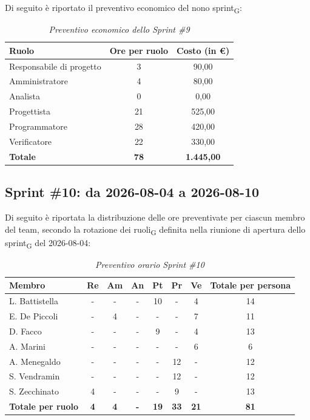 ﻿\documentclass[a4paper, 10pt, colorlinks=true, linkcolor=black, urlcolor=blue, citecolor=blue, hidelinks]{article}
\renewcommand{\arraystretch}{1.2}
\begin{document}
Di seguito è riportato il preventivo economico del nono sprint\textsubscript{G}:

\begin{table}[H]
    \centering
    \renewcommand{\arraystretch}{1.4}
    \begin{tabular}{|l|c|c|}
        \hline
        \rowcolor{bluBitless!15}
        \textbf{Ruolo} & \textbf{Ore per ruolo} & \textbf{Costo (in €)} \\
        \hline
        Responsabile di progetto & 3 & 90,00 \\ \hline
        Amministratore & 4 & 80,00 \\ \hline
        Analista & 0 & 0,00 \\ \hline
        Progettista & 21 & 525,00 \\ \hline
        Programmatore & 28 & 420,00 \\ \hline
        Verificatore & 22 & 330,00 \\ \hline
        \rowcolor{bluBitless!8}
        \textbf{Totale} & \textbf{78} & \textbf{1.445,00} \\ \hline
    \end{tabular}
    \caption{\textit{Preventivo economico dello Sprint \#9}}
\end{table}

\subsection{Sprint \#10: da 2026-08-04 a 2026-08-10}
Di seguito è riportata la distribuzione delle ore preventivate per ciascun membro del team, secondo la rotazione dei ruoli\textsubscript{G} definita nella riunione di apertura dello sprint\textsubscript{G} del 2026-08-04:

\begin{table}[H]
    \centering
    \renewcommand{\arraystretch}{1.4}
    \begin{tabular}{|l|c|c|c|c|c|c|c|}
        \hline
        \rowcolor{bluBitless!15}
        \textbf{Membro} & \textbf{Re} & \textbf{Am} & \textbf{An} & \textbf{Pt} & \textbf{Pr} & \textbf{Ve} & \textbf{Totale per persona} \\
        \hline
        L. Battistella & - & - & - & 10 & - & 4 & 14 \\ \hline
        E. De Piccoli & - & 4 & - & - & - & 7 & 11 \\ \hline
        D. Facco & - & - & - & 9 & - & 4 & 13 \\ \hline
        A. Marini & - & - & - & - & - & 6 & 6 \\ \hline
        A. Menegaldo & - & - & - & - & 12 & - & 12 \\ \hline
        S. Vendramin & - & - & - & - & 12 & - & 12 \\ \hline
        S. Zecchinato & 4 & - & - & - & 9 & - & 13 \\ \hline
        \rowcolor{bluBitless!8}
        \textbf{Totale per ruolo} & \textbf{4} & \textbf{4} & \textbf{-} & \textbf{19} & \textbf{33} & \textbf{21} & \textbf{81} \\
        \hline
    \end{tabular}
    \caption{\textit{Preventivo orario Sprint \#10}}
\end{table}
\end{document}

